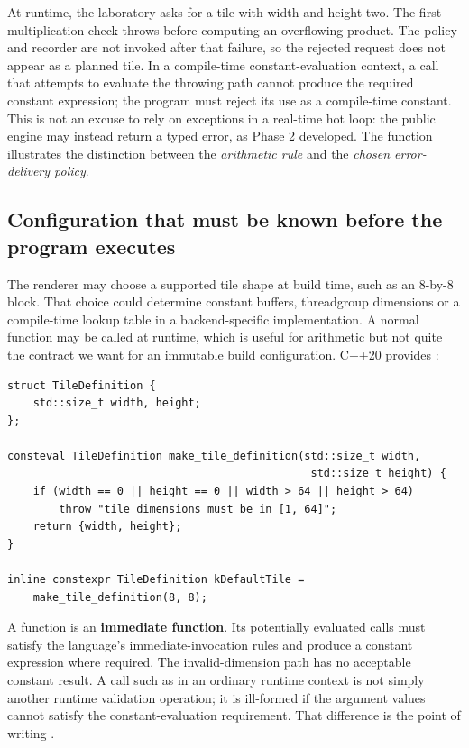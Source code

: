 At runtime, the laboratory asks for a tile with width  and height two. The first multiplication check throws before computing an overflowing product. The policy and recorder are not invoked after that failure, so the rejected request does not appear as a planned tile. In a compile-time constant-evaluation context, a call that attempts to evaluate the throwing path cannot produce the required constant expression; the program must reject its use as a compile-time constant. This is not an excuse to rely on exceptions in a real-time hot loop: the public engine may instead return a typed error, as Phase 2 developed. The function illustrates the distinction between the \emph{arithmetic rule} and the \emph{chosen error-delivery policy}.

\subsection{Configuration that must be known before the program executes}\label{05-engine-i-ch005-configuration-that-must-be-known-before-the-program-executes}

\hypertarget{05-engine-i-ch005-configuration-that-must-be-known-before-the-program-executes}{}

The renderer may choose a supported tile shape at build time, such as an 8-by-8 block. That choice could determine constant buffers, threadgroup dimensions or a compile-time lookup table in a backend-specific implementation. A normal  function may be called at runtime, which is useful for arithmetic but not quite the contract we want for an immutable build configuration. C++20 provides :

\begin{verbatim}
struct TileDefinition {
    std::size_t width, height;
};

consteval TileDefinition make_tile_definition(std::size_t width,
                                               std::size_t height) {
    if (width == 0 || height == 0 || width > 64 || height > 64)
        throw "tile dimensions must be in [1, 64]";
    return {width, height};
}

inline constexpr TileDefinition kDefaultTile =
    make_tile_definition(8, 8);
\end{verbatim}

A  function is an \textbf{immediate function}. Its potentially evaluated calls must satisfy the language's immediate-invocation rules and produce a constant expression where required. The invalid-dimension path has no acceptable constant result. A call such as  in an ordinary runtime context is not simply another runtime validation operation; it is ill-formed if the argument values cannot satisfy the constant-evaluation requirement. That difference is the point of writing .


